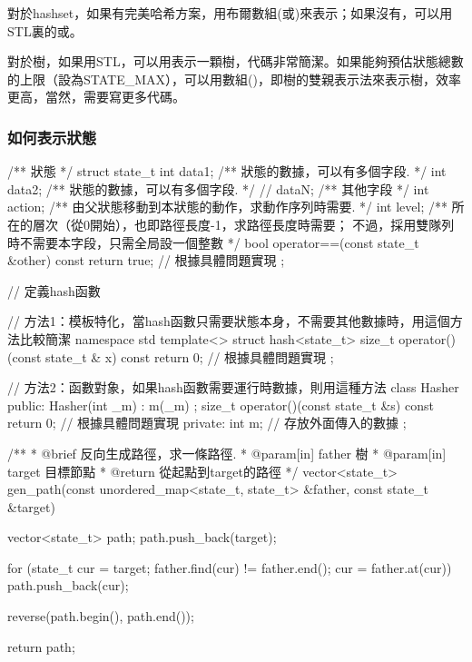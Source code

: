 對於hashset，如果有完美哈希方案，用布爾數組(或)來表示；如果沒有，可以用STL裏的或。

對於樹，如果用STL，可以用表示一顆樹，代碼非常簡潔。如果能夠預估狀態總數的上限（設為STATE_MAX），可以用數組()，即樹的雙親表示法來表示樹，效率更高，當然，需要寫更多代碼。


\subsubsection{如何表示狀態}

\begin{Codex}[label=bfs_common.h]
/** 狀態 */
struct state_t {
    int data1;  /** 狀態的數據，可以有多個字段. */
    int data2;  /** 狀態的數據，可以有多個字段. */
    // dataN;   /** 其他字段 */
    int action; /** 由父狀態移動到本狀態的動作，求動作序列時需要. */
    int level;  /** 所在的層次（從0開始），也即路徑長度-1，求路徑長度時需要；
                    不過，採用雙隊列時不需要本字段，只需全局設一個整數 */
    bool operator==(const state_t &other) const {
        return true;  // 根據具體問題實現
    }
};

// 定義hash函數

// 方法1：模板特化，當hash函數只需要狀態本身，不需要其他數據時，用這個方法比較簡潔
namespace std {
template<> struct hash<state_t> {
    size_t operator()(const state_t & x) const {
        return 0; // 根據具體問題實現
    }
};
}

// 方法2：函數對象，如果hash函數需要運行時數據，則用這種方法
class Hasher {
public:
    Hasher(int _m) : m(_m) {};
    size_t operator()(const state_t &s) const {
        return 0; // 根據具體問題實現
    }
private:
    int m; // 存放外面傳入的數據
};

/**
 * @brief 反向生成路徑，求一條路徑.
 * @param[in] father 樹
 * @param[in] target 目標節點
 * @return 從起點到target的路徑
 */
vector<state_t> gen_path(const unordered_map<state_t, state_t> &father,
        const state_t &target) {
    vector<state_t> path;
    path.push_back(target);

    for (state_t cur = target; father.find(cur) != father.end(); 
            cur = father.at(cur))
        path.push_back(cur);

    reverse(path.begin(), path.end());

    return path;
}


\end{Codex}
